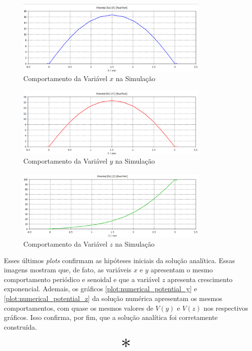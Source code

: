 \documentclass{report}
\begin{document}
\begin{figure}[h!]
  \centering
  \includegraphics[width=0.85\textwidth]{images/plots/simulation_potential_x.png}
  \caption{\label{plot:simul_potential_x} Comportamento da Variável $ x $ na Simulação}
\end{figure}

\begin{figure}[h!]
  \centering
  \includegraphics[width=0.85\textwidth]{images/plots/simulation_potential_y.png}
  \caption{\label{plot:simul_potential_y} Comportamento da Variável $ y $ na Simulação}
\end{figure}

\begin{figure}[h!]
  \centering
  \includegraphics[width=0.85\textwidth]{images/plots/simulation_potential_z.png}
  \caption{\label{plot:simul_potential_z} Comportamento da Variável $ z $ na Simulação}
\end{figure}

Esses últimos \textit{plots} confirmam as hipóteses iniciais da solução analítica. Essas imagens mostram que,
de fato, as variáveis $ x $ e $ y $ apresentam o mesmo comportamento periódico e senoidal e que a variável $ z $
apresenta crescimento exponencial. Ademais, os gráficos \ref{plot:numerical_potential_y} e \ref{plot:numerical_potential_z}
da solução numérica apresentam os mesmos comportamentos, com quase os mesmos valores de $ V(y) $ e $ V(z) $ nos respectivos gráficos. Isso confirma, por fim, que
a solução analítica foi corretamente construída.

\begin{center}
  \[ \scalebox{3}{$ * $} \]
\end{center}
\end{document}
